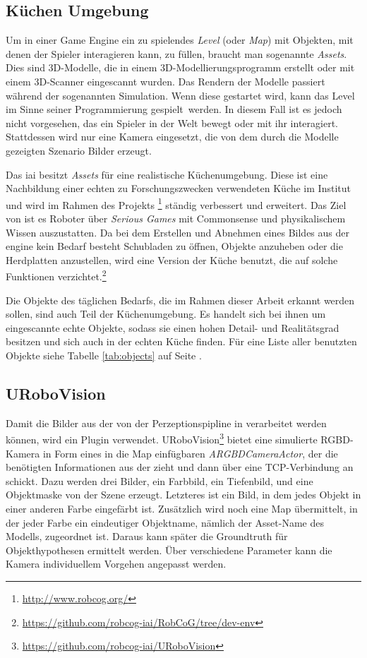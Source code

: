 \subsection{Küchen Umgebung}
\label{subsec:kitchenenvironment}
Um in einer Game Engine ein zu spielendes \textit{Level} (oder \textit{Map}) mit Objekten, mit denen der Spieler interagieren kann, zu füllen, braucht man sogenannte \textit{Assets}. Dies sind 3D-Modelle, die in einem 3D-Modellierungsprogramm erstellt oder mit einem 3D-Scanner eingescannt wurden. Das Rendern der Modelle passiert während der sogenannten Simulation. Wenn diese gestartet wird, kann das Level im Sinne seiner Programmierung \glqq gespielt\grqq \ werden. In diesem Fall ist es jedoch nicht vorgesehen, das ein Spieler in der Welt bewegt oder mit ihr interagiert. Stattdessen wird nur eine Kamera eingesetzt, die von dem durch die Modelle gezeigten Szenario Bilder erzeugt.  \par
Das \gls{iai} besitzt \textit{Assets} für eine realistische Küchenumgebung. Diese ist eine Nachbildung einer echten zu Forschungszwecken verwendeten Küche im Institut und wird im Rahmen des Projekts \robcog\footnote{\url{http://www.robcog.org/}} ständig verbessert und erweitert. Das Ziel von \robcog ist es Roboter über \textit{Serious Games} mit Commonsense und physikalischem Wissen auszustatten. Da bei dem Erstellen und Abnehmen eines Bildes aus der \acrshort{engine} kein Bedarf besteht Schubladen zu öffnen, Objekte anzuheben oder die Herdplatten anzustellen, wird eine Version der Küche benutzt, die auf solche Funktionen verzichtet.\footnote{\url{https://github.com/robcog-iai/RobCoG/tree/dev-env}} \par
Die Objekte des täglichen Bedarfs, die im Rahmen dieser Arbeit erkannt werden sollen, sind auch Teil der Küchenumgebung. Es handelt sich bei ihnen um eingescannte echte Objekte, sodass sie einen hohen Detail- und Realitätsgrad besitzen und sich auch in der echten Küche finden. Für eine Liste aller benutzten Objekte siehe Tabelle \ref{tab:objects} auf Seite \pageref{tab:objects}.
 
\subsection{URoboVision}
\label{subsec:urobovision}
Damit die Bilder aus der \unreal von der Perzeptionspipline in \robosherlock verarbeitet werden können, wird ein \unreal Plugin verwendet. URoboVision\footnote{\url{https://github.com/robcog-iai/URoboVision}} bietet eine simulierte RGBD-Kamera in Form eines in die Map einfügbaren \textit{ARGBDCameraActor}, der die benötigten Informationen aus der \unreal zieht und dann über eine TCP-Verbindung an \robosherlock schickt.  Dazu werden drei Bilder, ein Farbbild, ein Tiefenbild, und eine Objektmaske von der Szene erzeugt. Letzteres ist ein Bild, in dem jedes Objekt in einer anderen Farbe eingefärbt ist. Zusätzlich wird noch eine Map übermittelt, in der jeder Farbe ein eindeutiger Objektname, nämlich der Asset-Name des Modells, zugeordnet ist. Daraus kann später die Groundtruth für Objekthypothesen  ermittelt werden. Über verschiedene Parameter kann die Kamera individuellem Vorgehen angepasst werden. \par 

